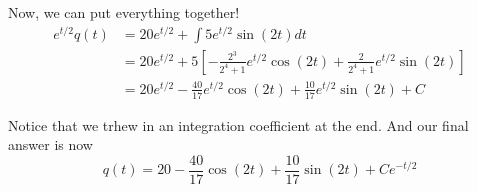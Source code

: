 Now, we can put everything together!
\begin{align*}
e^{t/2} q(t) &= 20 e^{t/2} + \int 5 e^{t/2} \sin(2t) dt \\
&= 20 e^{t/2} + 5 \left[ -\frac{2^3}{2^4+1}e^{t/2}\cos(2t) + \frac{2}{2^4+1} e^{t/2}\sin(2t) \right] \\
&= 20 e^{t/2} -\frac{40}{17}e^{t/2}\cos(2t) + \frac{10}{17} e^{t/2}\sin(2t) + C
\end{align*}

Notice that we trhew in an integration coefficient at the end.
And our final answer is now
$$
q(t) =
20 -\frac{40}{17}\cos(2t) + \frac{10}{17} \sin(2t) + Ce^{-t/2}
$$